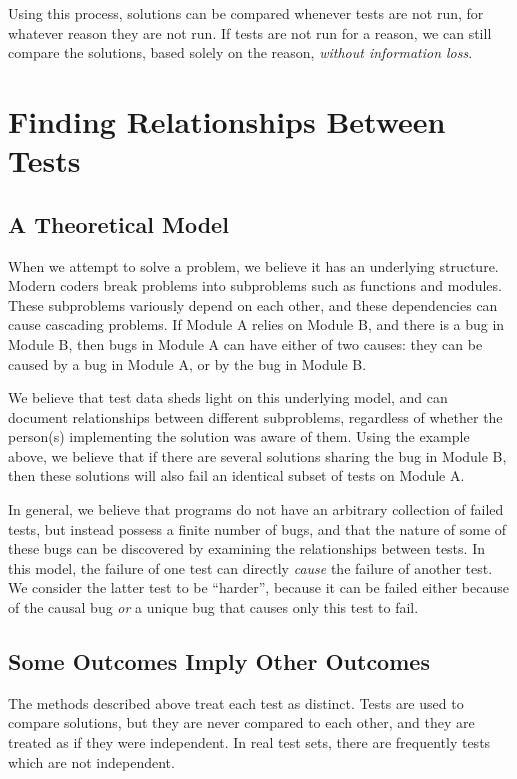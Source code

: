 \documentclass[11pt,twoside]{article}
\theoremstyle{definition}
\begin{document}
Using this process, solutions can be compared whenever tests are not run, for whatever reason they are not run. If tests are not run for a reason, we can still compare the solutions, based solely on the reason, \emph{without information loss}.

\section{Finding Relationships Between Tests}
\subsection{A Theoretical Model}
When we attempt to solve a problem, we believe it has an underlying structure. Modern coders break problems into subproblems such as functions and modules. These subproblems variously depend on each other, and these dependencies can cause cascading problems. If Module A relies on Module B, and there is a bug in Module B, then bugs in Module A can have either of two causes: they can be caused by a bug in Module A, or by the bug in Module B.

We believe that test data sheds light on this underlying model, and can document relationships between different subproblems, regardless of whether the person(s) implementing the solution was aware of them. Using the example above, we believe that if there are several solutions sharing the bug in Module B, then these solutions will also fail an identical subset of tests on Module A.

In general, we believe that programs do not have an arbitrary collection of failed tests, but instead possess a finite number of bugs, and that the nature of some of these bugs can be discovered by examining the relationships between tests. In this model, the failure of one test can directly \emph{cause} the failure of another test. We consider the latter test to be ``harder'', because it can be failed either because of the causal bug \emph{or} a unique bug that causes only this test to fail.

\subsection{Some Outcomes Imply Other Outcomes}
The methods described above treat each test as distinct. Tests are used to compare solutions, but they are never compared to each other, and they are treated as if they were independent. In real test sets, there are frequently tests which are not independent.
\end{document}
